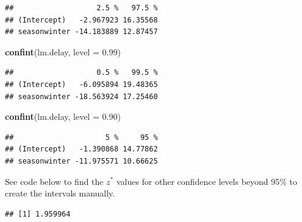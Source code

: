 \documentclass[
]{book}
\newenvironment{Shaded}{\begin{snugshade}}{\end{snugshade}}
\newcommand{\CommentTok}[1]{\textcolor[rgb]{0.56,0.35,0.01}{\textit{#1}}}
\newcommand{\DataTypeTok}[1]{\textcolor[rgb]{0.13,0.29,0.53}{#1}}
\newcommand{\DecValTok}[1]{\textcolor[rgb]{0.00,0.00,0.81}{#1}}
\newcommand{\FloatTok}[1]{\textcolor[rgb]{0.00,0.00,0.81}{#1}}
\newcommand{\KeywordTok}[1]{\textcolor[rgb]{0.13,0.29,0.53}{\textbf{#1}}}
\newcommand{\NormalTok}[1]{#1}
\newcommand{\OperatorTok}[1]{\textcolor[rgb]{0.81,0.36,0.00}{\textbf{#1}}}
\newcommand{\StringTok}[1]{\textcolor[rgb]{0.31,0.60,0.02}{#1}}
\begin{document}
\begin{verbatim}
##                   2.5 %   97.5 %
## (Intercept)   -2.967923 16.35568
## seasonwinter -14.183889 12.87457
\end{verbatim}

\begin{Shaded}
\begin{Highlighting}[]
\KeywordTok{confint}\NormalTok{(lm.delay, }\DataTypeTok{level =} \FloatTok{0.99}\NormalTok{)}
\end{Highlighting}
\end{Shaded}

\begin{verbatim}
##                   0.5 %   99.5 %
## (Intercept)   -6.095894 19.48365
## seasonwinter -18.563924 17.25460
\end{verbatim}

\begin{Shaded}
\begin{Highlighting}[]
\KeywordTok{confint}\NormalTok{(lm.delay, }\DataTypeTok{level =} \FloatTok{0.90}\NormalTok{)}
\end{Highlighting}
\end{Shaded}

\begin{verbatim}
##                     5 %     95 %
## (Intercept)   -1.390868 14.77862
## seasonwinter -11.975571 10.66625
\end{verbatim}

See code below to find the \(z^*\) values for other confidence levels beyond 95\% to create the intervals manually.

\begin{Shaded}
\end{Shaded}

\begin{verbatim}
## [1] 1.959964
\end{verbatim}

\begin{Shaded}
\end{Shaded}
\end{document}
